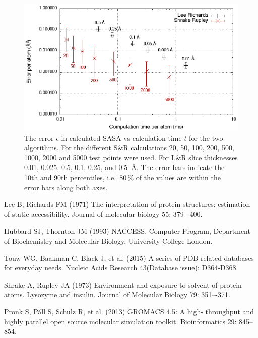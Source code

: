 \documentclass[a4paper,11pt]{article}
\begin{document}
\begin{small}
\begin{figure}
  \begin{center}
  \includegraphics{fig/precision}
  \caption{The error $\epsilon$ in calculated SASA vs calculation time
    $t$ for the two algorithms. For the different S\&R calculations
    20, 50, 100, 200, 500, 1000, 2000 and 5000 test points were
    used. For L\&R slice thicknesses 0.01, 0.025, 0.5, 0.1, 0.25, and
    0.5~Å. The error bars indicate the 10th and 90th percentiles,
    i.e.\ $80\,\%$ of the values are within the error bars along both axes.
    \label{fig:precision}}
  \end{center}
\end{figure}


\begin{thebibliography}{50}

  Lee B, Richards FM (1971) The interpretation of protein
  structures: estimation of static accessibility. Journal of molecular
  biology 55: 379–-400.

  Hubbard SJ, Thornton JM (1993) NACCESS. Computer Program,
  Department of Biochemistry and Molecular Biology, University College
  London.

  Touw WG, Baakman C, Black J, et al. (2015)
  A series of PDB related databases for everyday needs.
  Nucleic Acids Research 43(Database issue): D364-D368.

  Shrake A, Rupley JA (1973) Environment and exposure to
  solvent of protein atoms. Lysozyme and insulin. Journal of Molecular
  Biology 79: 351–-371.

  Pronk S, Páll S, Schulz R, et al. (2013) GROMACS 4.5: A high-
  throughput and highly parallel open source molecular simulation
  toolkit. Bioinformatics 29: 845--854.


\end{thebibliography}
\end{small}
\end{document}
